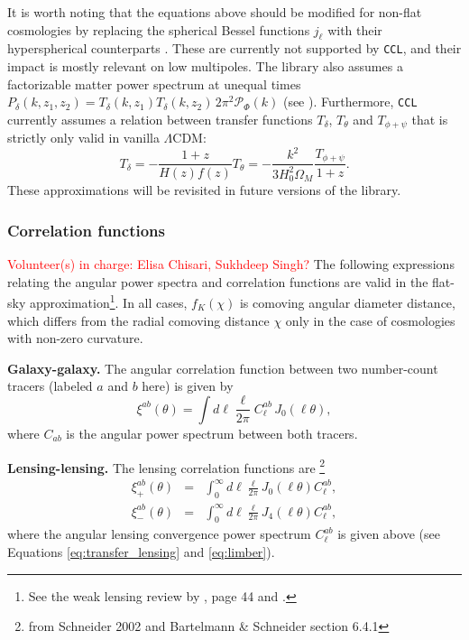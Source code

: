 \documentclass[\docopts]{\docclass}
\newcommand{\vol}[1]{\textcolor{red}{Volunteer(s) in charge: #1}}
\newcommand{\ccl}{{\tt CCL}\xspace}
\begin{document}
\noindent
It is worth noting that the equations above should be modified for non-flat cosmologies by replacing the spherical Bessel functions $j_\ell$ with their hyperspherical counterparts \cite{1994ApJ...432....7K}. These are currently not supported by \ccl, and their impact is mostly relevant on low multipoles. The library also assumes a factorizable matter power spectrum at unequal times $P_\delta(k,z_1,z_2)=T_\delta(k,z_1)T_\delta(k,z_2)\,2\pi^2\mathcal{P}_\Phi(k)$ (see \cite{2017PhRvD..95f3522K}). Furthermore, \ccl currently assumes a relation between transfer functions $T_\delta$, $T_\theta$ and $T_{\phi+\psi}$ that is strictly only valid in vanilla $\Lambda$CDM:
\begin{equation}
  T_\delta=-\frac{1+z}{H(z)f(z)}T_\theta=-\frac{k^2}{3H_0^2\Omega_M}\frac{T_{\phi+\psi}}{1+z}.
\end{equation}
These approximations will be revisited in future versions of the library.



\subsubsection{Correlation functions}
\vol{Elisa Chisari, Sukhdeep Singh?}
The following expressions relating the angular power spectra and correlation functions are valid in the flat-sky approximation\footnote{See the weak lensing review by \citet{Bartelmann01}, page 44 and \citet{Joachimi10}.}. In all cases, $f_K(\chi)$ is comoving angular diameter distance, which differs from the radial comoving distance $\chi$ only in the case of cosmologies with non-zero curvature.

{\bf Galaxy-galaxy.} The angular correlation function between two number-count tracers (labeled $a$ and $b$ here) is given by
\begin{equation}
  \xi^{ab}(\theta) = \int d\ell \frac{\ell}{2\pi} C^{ab}_\ell\, J_0(\ell\theta),
\label{eq:xiclu}
\end{equation}
where $C_{ab}$ is the angular power spectrum between both tracers.

{\bf Lensing-lensing.} The lensing correlation functions are \footnote{from Schneider 2002 and Bartelmann \& Schneider section 6.4.1}
\begin{eqnarray}
  \xi^{ab}_{+}(\theta)&=&\int_0^{\infty}d\ell\frac{\ell}{2\pi}J_0(\ell\theta)C^{ab}_\ell,\\
  \xi^{ab}_{-}(\theta)&=&\int_0^{\infty}d\ell\frac{\ell}{2\pi}J_4(\ell\theta)C^{ab}_\ell,
\label{eq:xipxim}
\end{eqnarray}
where the angular lensing convergence power spectrum $C^{ab}_\ell$ is given above (see Equations \ref{eq:transfer_lensing} and \ref{eq:limber}).
\end{document}
